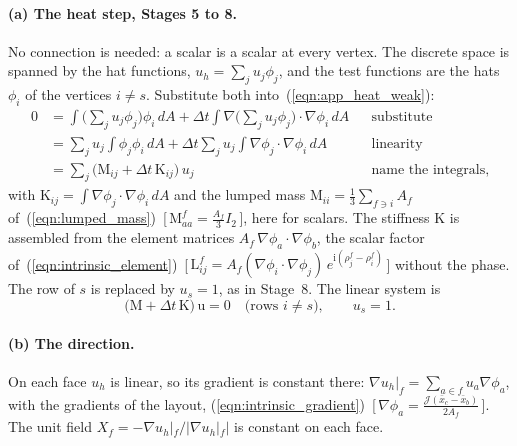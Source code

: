 \paragraph{(a) The heat step, Stages 5 to 8.} No connection is needed: a scalar is a scalar at every vertex. The discrete space is spanned by the hat functions, $u_h = \sum_j u_j\phi_j$, and the test functions are the hats $\phi_i$ of the vertices $i \ne s$. Substitute both into~(\ref{eqn:app_heat_weak}):
\begin{align*}
0 &= \int \Big(\sum_j u_j\phi_j\Big)\phi_i\, dA + \Delta t\int\nabla\Big(\sum_j u_j\phi_j\Big)\cdot\nabla\phi_i\, dA && \text{substitute} \\
&= \sum_j u_j\int\phi_j\phi_i\, dA + \Delta t\sum_j u_j\int\nabla\phi_j\cdot\nabla\phi_i\, dA && \text{linearity} \\
&= \sum_j \big(\mathrm M_{ij} + \Delta t\, \mathrm K_{ij}\big)\, u_j && \text{name the integrals,}
\end{align*}
with $\mathrm K_{ij} = \int\nabla\phi_j\cdot\nabla\phi_i\, dA$ and the lumped mass $\mathrm M_{ii} = \frac13\sum_{f\ni i} A_f$ of~(\ref{eqn:lumped_mass})~[\,$\mathrm M^f_{aa} = \tfrac{A_f}3 I_2$\,], here for scalars. The stiffness $\mathrm K$ is assembled from the element matrices $A_f\,\nabla\phi_a\cdot\nabla\phi_b$, the scalar factor of~(\ref{eqn:intrinsic_element})~[\,$\mathrm L^f_{ij} = A_f(\nabla\phi_i\cdot\nabla\phi_j)\, e^{\mathrm i(\rho_j^f - \rho_i^f)}$\,] without the phase. The row of $s$ is replaced by $u_s = 1$, as in Stage~8. The linear system is
\begin{equation*}
\big(\mathrm M + \Delta t\,\mathrm K\big)\, \mathrm u = 0 \quad\text{(rows } i \ne s\text{)}, \qquad u_s = 1 .
\end{equation*}

\paragraph{(b) The direction.} On each face $u_h$ is linear, so its gradient is constant there: $\nabla u_h|_f = \sum_{a\in f} u_a\nabla\phi_a$, with the gradients of the layout, (\ref{eqn:intrinsic_gradient})~[\,$\nabla\phi_a = \frac{\mathcal J(\bar x_c - \bar x_b)}{2A_f}$\,]. The unit field $X_f = -\nabla u_h|_f / |\nabla u_h|_f|$ is constant on each face.

